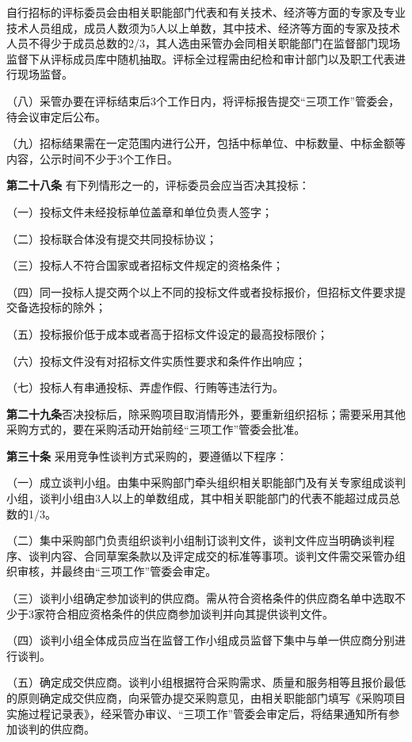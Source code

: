 自行招标的评标委员会由相关职能部门代表和有关技术、经济等方面的专家及专业技术人员组成，成员人数须为5人以上单数，其中技术、经济等方面的专家及技术人员不得少于成员总数的2/3，其人选由采管办会同相关职能部门在监督部门现场监督下从评标成员库中随机抽取。评标全过程需由纪检和审计部门以及职工代表进行现场监督。

（八）采管办要在评标结束后3个工作日内，将评标报告提交“三项工作”管委会，待会议审定后公布。

（九）招标结果需在一定范围内进行公开，包括中标单位、中标数量、中标金额等内容，公示时间不少于3个工作日。

\textbf{第二十八条 }\quad 有下列情形之一的，评标委员会应当否决其投标：

（一）投标文件未经投标单位盖章和单位负责人签字；

    （二）投标联合体没有提交共同投标协议；

    （三）投标人不符合国家或者招标文件规定的资格条件；

    （四）同一投标人提交两个以上不同的投标文件或者投标报价，但招标文件要求提交备选投标的除外；

    （五）投标报价低于成本或者高于招标文件设定的最高投标限价；

    （六）投标文件没有对招标文件实质性要求和条件作出响应；

    （七）投标人有串通投标、弄虚作假、行贿等违法行为。

\textbf{第二十九条}\quad  否决投标后，除采购项目取消情形外，要重新组织招标；需要采用其他采购方式的，要在采购活动开始前经“三项工作”管委会批准。

\textbf{第三十条} \quad 采用竞争性谈判方式采购的，要遵循以下程序：

    （一）成立谈判小组。由集中采购部门牵头组织相关职能部门及有关专家组成谈判小组，谈判小组由3人以上的单数组成，其中相关职能部门的代表不能超过成员总数的1/3。

    （二）集中采购部门负责组织谈判小组制订谈判文件，谈判文件应当明确谈判程序、谈判内容、合同草案条款以及评定成交的标准等事项。谈判文件需交采管办组织审核，并最终由“三项工作”管委会审定。

    （三）谈判小组确定参加谈判的供应商。需从符合资格条件的供应商名单中选取不少于3家符合相应资格条件的供应商参加谈判并向其提供谈判文件。

    （四）谈判小组全体成员应当在监督工作小组成员监督下集中与单一供应商分别进行谈判。

    （五）确定成交供应商。谈判小组根据符合采购需求、质量和服务相等且报价最低的原则确定成交供应商，向采管办提交采购意见，由相关职能部门填写《采购项目实施过程记录表》，经采管办审议、“三项工作”管委会审定后，将结果通知所有参加谈判的供应商。


